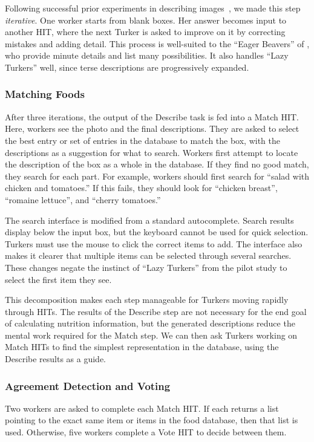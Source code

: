 Following successful prior experiments in describing
images~\cite{little2010turkit}, we made this step
\emph{iterative}. One worker starts from blank boxes. Her answer
becomes input to another HIT, where the next Turker is asked to
improve on it by correcting mistakes and adding detail. This process
is well-suited to the ``Eager Beavers'' of
\cite{bernstein2010soylent}, who provide minute details and list many
possibilities. It also handles ``Lazy Turkers'' well, since terse
descriptions are progressively expanded.

\subsubsection{Matching Foods} 
After three iterations, the output of the Describe task is fed into a
Match HIT. Here, workers see the photo and the final
descriptions. They are asked to select the best entry or set of
entries in the database to match the box, with the descriptions as a
suggestion for what to search. Workers first attempt to locate the
description of the box as a whole in the database. If they find no
good match, they search for each part. For example, workers should
first search for ``salad with chicken and tomatoes.'' If this fails,
they should look for ``chicken breast'', ``romaine lettuce'', and
``cherry tomatoes.''

The search interface is modified from a standard autocomplete.  Search
results display below the input box, but the keyboard cannot be used
for quick selection. Turkers must use the mouse to click the correct
items to add. The interface also makes it clearer that multiple items
can be selected through several searches.  These changes negate the
instinct of ``Lazy Turkers'' from the pilot study to select the first
item they see.

This decomposition makes each step manageable for Turkers moving
rapidly through HITs.  The results of the Describe step are not
necessary for the end goal of calculating nutrition information, but the 
generated descriptions reduce the mental work required for the Match
step.  We can then ask Turkers working on Match HITs to find
the simplest representation in the database, using the Describe
results as a guide.

\subsubsection{Agreement Detection and Voting} 
Two workers are asked to complete each Match HIT. If each returns a
list pointing to the exact same item or items in the food database,
then that list is used.  Otherwise, five workers complete a Vote HIT
to decide between them.

